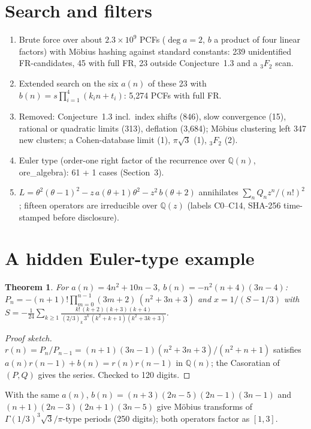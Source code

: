 \documentclass[11pt]{article}
\newtheorem{theorem}{Theorem}
\begin{document}
\section{Search and filters}
\begin{enumerate}
\item Brute force over about $2.3\times10^9$ PCFs ($\deg a=2$, $b$ a product of four linear factors) with M\"obius hashing against
standard constants: 239 unidentified FR-candidates, 45 with full FR, 23 outside Conjecture~1.3 and a ${}_3F_2$ scan.
\item Extended search on the six $a(n)$ of these 23 with $b(n)=s\prod_{i=1}^4(k_in+t_i)$: 5,274 PCFs with full FR.
\item Removed: Conjecture~1.3 incl.\ index shifts (846), slow convergence (15), rational or quadratic limits (313), deflation (3,684);
M\"obius clustering left 347 new clusters; a Cohen-database limit (1), $\pi\sqrt3$ (1), ${}_3F_2$ (2).
\item Euler type (order-one right factor of the recurrence over $\mathbb Q(n)$, ore\_algebra): 61 + 1 cases (Section~3).
\item $L=\theta^2(\theta-1)^2-z\,a(\theta+1)\theta^2-z^2\,b(\theta+2)$ annihilates $\sum_nQ_nz^n/(n!)^2$; fifteen operators are
irreducible over $\mathbb Q(z)$ (labels C0--C14, SHA-256 time-stamped before disclosure).
\end{enumerate}

\section{A hidden Euler-type example}
\begin{theorem}
For $a(n)=4n^2+10n-3$, $b(n)=-n^2(n+4)(3n-4)$: $P_n=-(n+1)!\prod_{m=0}^{n-1}(3m+2)\,(n^2+3n+3)$ and $x=1/(S-1/3)$ with
$S=-\frac1{24}\sum_{k\ge1}\frac{k!\,(k+2)(k+3)(k+4)}{(2/3)_k\,3^k\,(k^2+k+1)(k^2+3k+3)}$.
\end{theorem}
\begin{proof}[Proof sketch]
$r(n)=P_n/P_{n-1}=(n+1)(3n-1)(n^2+3n+3)/(n^2+n+1)$ satisfies $a(n)r(n-1)+b(n)=r(n)r(n-1)$ in $\mathbb Q(n)$; the Casoratian of
$(P,Q)$ gives the series. Checked to 120 digits.
\end{proof}
With the same $a(n)$, $b(n)=(n+3)(2n-5)(2n-1)(3n-1)$ and $(n+1)(2n-3)(2n+1)(3n-5)$ give M\"obius transforms of
$\Gamma(1/3)^3\sqrt3/\pi$-type periods (250 digits); both operators factor as $[1,3]$.
\end{document}
